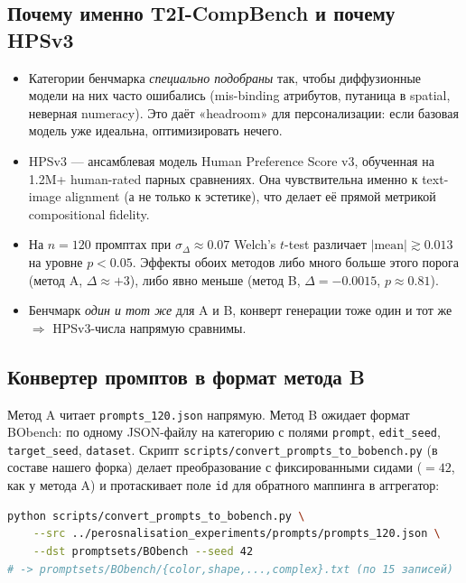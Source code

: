 \documentclass[11pt,a4paper]{article}
\begin{document}
\subsection{Почему именно T2I-CompBench и почему HPSv3}

\begin{itemize}[leftmargin=2em,itemsep=2pt]
  \item Категории бенчмарка \emph{специально подобраны} так, чтобы
        диффузионные модели на них часто ошибались (mis-binding атрибутов,
        путаница в spatial, неверная numeracy). Это даёт «headroom»
        для персонализации: если базовая модель уже идеальна, оптимизировать
        нечего.
  \item HPSv3 --- ансамблевая модель Human Preference Score v3, обученная
        на 1.2M+ human-rated парных сравнениях. Она чувствительна именно к
        text-image alignment (а не только к эстетике), что делает её
        прямой метрикой compositional fidelity.
  \item На $n=120$ промптах при $\sigma_\Delta \approx 0.07$ Welch's
        $t$-test различает $|\mathrm{mean}| \gtrsim 0.013$ на уровне
        $p<0.05$. Эффекты обоих методов либо много больше этого порога
        (метод A, $\Delta \approx +3$), либо явно меньше (метод B,
        $\Delta = -0.0015$, $p \approx 0.81$).
  \item Бенчмарк \emph{один и тот же} для A и B, конверт генерации тоже
        один и тот же $\Rightarrow$ HPSv3-числа напрямую сравнимы.
\end{itemize}

\subsection{Конвертер промптов в формат метода B}

Метод A читает \texttt{prompts\_120.json} напрямую. Метод B ожидает
формат BObench: по одному JSON-файлу на категорию с полями \texttt{prompt},
\texttt{edit\_seed}, \texttt{target\_seed}, \texttt{dataset}. Скрипт
\texttt{scripts/convert\_prompts\_to\_bobench.py} (в составе нашего форка)
делает преобразование с фиксированными сидами ($=42$, как у метода A) и
протаскивает поле \texttt{id} для обратного маппинга в аггрегатор:

\begin{lstlisting}[language=bash]
python scripts/convert_prompts_to_bobench.py \
    --src ../perosnalisation_experiments/prompts/prompts_120.json \
    --dst promptsets/BObench --seed 42
# -> promptsets/BObench/{color,shape,...,complex}.txt (по 15 записей)
\end{lstlisting}
\end{document}
